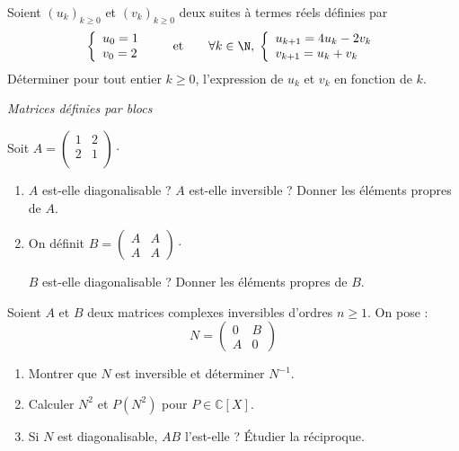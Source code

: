 \documentclass[a4paper,10pt]{report}
\begin{document}
\begin{Exa} Soient $(u_k)_{k \geq 0}$ et $(v_k)_{k \geq 0}$ deux suites \`a termes r\'eels d\'efinies par
$$\left\{\begin{array}{l}u_0=1\\ v_0=2\end{array}\right.\qquad\hbox{et}\qquad \forall k\in\N,\;\left\{\begin{array}{l}u_{k+1}=4u_k-2v_k\\
v_{k+1}=u_k+v_k\end{array}\right.$$
Déterminer pour tout entier $k \geq 0$, l'expression de $u_k$ et $v_k$ en fonction de $k$.
\end{Exa}


\medskip

\begin{center}
\textit{{ {\large Matrices définies par blocs}}}
\end{center}

\medskip

\begin{Exa}[\ding{80}] Soit $A= \begin{pmatrix}
1& 2 \\
2 & 1 \\
\end{pmatrix}\cdot$
\begin{enumerate}
\item $A$ est-elle diagonalisable ? $A$ est-elle inversible ? Donner les éléments propres de $A$.
\item  On définit $B = \begin{pmatrix}
A & A \\
A & A 
\end{pmatrix}\cdot$

$B$ est-elle diagonalisable ? Donner les éléments propres de $B$.
\end{enumerate}
\end{Exa}


\begin{Exa}[\ding{80}] Soient $A$ et $B$ deux matrices complexes inversibles d'ordres $n \geq 1$. On pose :
$$ N = \begin{pmatrix}
0 & B \\
A & 0
\end{pmatrix}$$
\begin{enumerate}
\item Montrer que $N$ est inversible et déterminer $N^{-1}$.
\item Calculer $N^2$ et $P(N^2)$ pour $P \in \mathbb{C}[X]$.
\item Si $N$ est diagonalisable, $AB$ l'est-elle ? Étudier la réciproque.
\end{enumerate}
\end{Exa}
\end{document}
